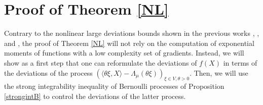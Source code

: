 \documentclass[a4paper,oneside,11pt]{article}
\begin{document}
%
%
%
%
%


 
\section{Proof of Theorem \ref{NL}}
Contrary to the nonlinear large deviations bounds shown in the previous works \cite{CD}, \cite{Yan}, and \cite{Eldan}, the proof of Theorem \ref{NL} will not rely on the computation of exponential moments of functions with a low complexity set of gradients. Instead, we will show as a first step that one can  reformulate the deviations of $f(X)$ in terms of the deviations of the process $(\langle \theta \xi, X\rangle - \Lambda_\mu(\theta \xi))_{ \xi \in V, \theta>0}$.  Then, we will use the strong integrability inequality of Bernoulli processes of Proposition \ref{strongintB} to control the deviations of the latter process.
\end{document}
